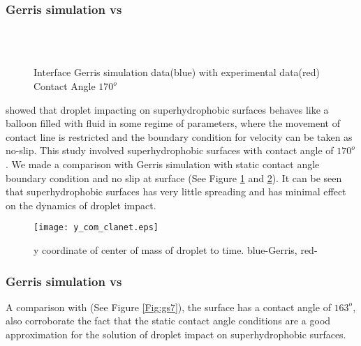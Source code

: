 \subsubsection{\textbf{Gerris simulation vs \cite{Clanet2004}}}
\begin{figure}[H]
 \centering
       \\
       \\
 \caption{Interface Gerris simulation data(blue) with \cite{Clanet2004} experimental data(red) Contact Angle $170^o$}
 \label{Fig:gs6}
 \end{figure}
  \cite{Clanet2004} showed that droplet impacting on superhydrophobic surfaces behaves like a balloon filled with fluid in some regime of parameters,
 where the movement of contact line is restricted and the boundary condition for velocity can be taken as no-slip. 
 This study involved superhydrophobic surfaces with contact angle of  $170^o$. We made a comparison with Gerris simulation with static contact angle
 boundary condition and no slip  at surface (See Figure \ref{Fig:gs6} and \ref{Fig:y_com_clanet}). It can be seen that superhydrophobic surfaces has very little
 spreading and has minimal effect on 
 the dynamics of droplet impact.
  \begin{figure}[H]
  \centering
 \texttt{[image: y\_com\_clanet.eps]}
 \caption{y coordinate of center of mass of droplet to time. blue-Gerris, red-\cite{Clanet2004}}
 \label{Fig:y_com_clanet}
\end{figure}

 \subsubsection{\textbf{Gerris simulation vs \cite{Wang2007}}}
 A comparison with \cite{Wang2007} (See Figure \ref{Fig:gs7}), the surface has a contact angle of $163^o$, also corroborate the fact that the static contact angle conditions
are a good approximation for the solution of droplet impact on superhydrophobic surfaces.\\

